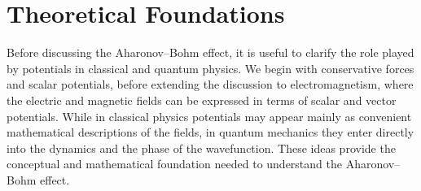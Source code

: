 \chapter{Theoretical Foundations}

Before discussing the Aharonov--Bohm effect, it is useful to clarify the role
played by potentials in classical and quantum physics. We begin with
conservative forces and scalar potentials, before extending the discussion to
electromagnetism, where the electric and magnetic fields can be expressed in
terms of scalar and vector potentials. While in classical physics potentials
may appear mainly as convenient mathematical descriptions of the fields, in
quantum mechanics they enter directly into the dynamics and the phase of the
wavefunction. These ideas provide the conceptual and mathematical foundation
needed to understand the Aharonov--Bohm effect.


